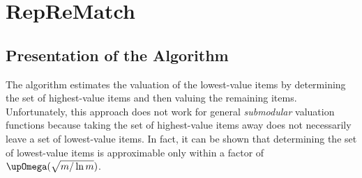 \section{RepReMatch}
\label{sec:reprematch}

\subsection{Presentation of the Algorithm}
\label{subsec:reprematch:presentation}

The algorithm \SMatch{} estimates the valuation of the lowest-value items by determining the set of highest-value items and then valuing the remaining items.
Unfortunately, this approach does not work for general \emph{submodular} valuation functions because taking the set of highest-value items away does not necessarily leave a set of lowest-value items.
In fact, it can be shown \cite{submodular_low_value} that determining the set of lowest-value items is approximable only within a factor of \(\bigomega(\sqrt{m / \ln m})\).

